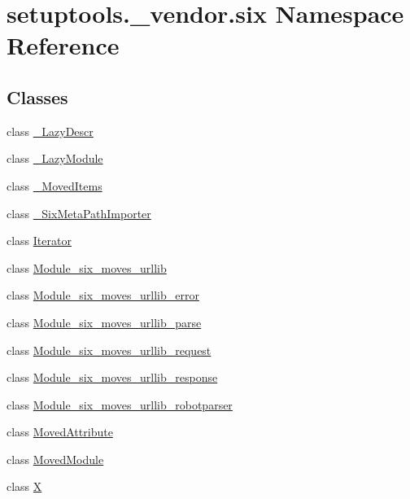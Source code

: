 \hypertarget{namespacesetuptools_1_1__vendor_1_1six}{}\section{setuptools.\+\_\+vendor.\+six Namespace Reference}
\label{namespacesetuptools_1_1__vendor_1_1six}
\subsection*{Classes}
\begin{DoxyCompactItemize}
\item 
class \hyperlink{classsetuptools_1_1__vendor_1_1six_1_1___lazy_descr}{\+\_\+\+Lazy\+Descr}
\item 
class \hyperlink{classsetuptools_1_1__vendor_1_1six_1_1___lazy_module}{\+\_\+\+Lazy\+Module}
\item 
class \hyperlink{classsetuptools_1_1__vendor_1_1six_1_1___moved_items}{\+\_\+\+Moved\+Items}
\item 
class \hyperlink{classsetuptools_1_1__vendor_1_1six_1_1___six_meta_path_importer}{\+\_\+\+Six\+Meta\+Path\+Importer}
\item 
class \hyperlink{classsetuptools_1_1__vendor_1_1six_1_1_iterator}{Iterator}
\item 
class \hyperlink{classsetuptools_1_1__vendor_1_1six_1_1_module__six__moves__urllib}{Module\+\_\+six\+\_\+moves\+\_\+urllib}
\item 
class \hyperlink{classsetuptools_1_1__vendor_1_1six_1_1_module__six__moves__urllib__error}{Module\+\_\+six\+\_\+moves\+\_\+urllib\+\_\+error}
\item 
class \hyperlink{classsetuptools_1_1__vendor_1_1six_1_1_module__six__moves__urllib__parse}{Module\+\_\+six\+\_\+moves\+\_\+urllib\+\_\+parse}
\item 
class \hyperlink{classsetuptools_1_1__vendor_1_1six_1_1_module__six__moves__urllib__request}{Module\+\_\+six\+\_\+moves\+\_\+urllib\+\_\+request}
\item 
class \hyperlink{classsetuptools_1_1__vendor_1_1six_1_1_module__six__moves__urllib__response}{Module\+\_\+six\+\_\+moves\+\_\+urllib\+\_\+response}
\item 
class \hyperlink{classsetuptools_1_1__vendor_1_1six_1_1_module__six__moves__urllib__robotparser}{Module\+\_\+six\+\_\+moves\+\_\+urllib\+\_\+robotparser}
\item 
class \hyperlink{classsetuptools_1_1__vendor_1_1six_1_1_moved_attribute}{Moved\+Attribute}
\item 
class \hyperlink{classsetuptools_1_1__vendor_1_1six_1_1_moved_module}{Moved\+Module}
\item 
class \hyperlink{classsetuptools_1_1__vendor_1_1six_1_1_x}{X}
\end{DoxyCompactItemize}
